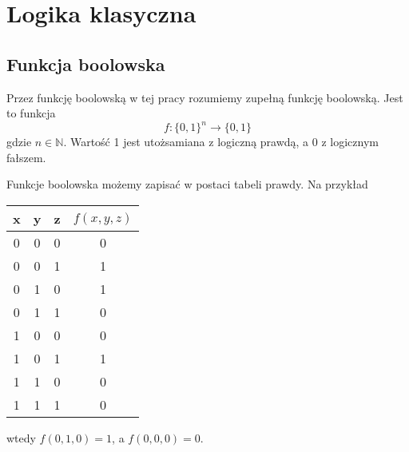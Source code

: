 \chapter{Logika klasyczna}
\thispagestyle{chapterBeginStyle}
\label{rozdzial0a}
\section{Funkcja boolowska}
\begin{definition}
    Przez funkcję boolowską w tej pracy rozumiemy zupełną funkcję boolowską. Jest to funkcja
    \[f:\{0,1\}^n \rightarrow \{0,1\}\]
    gdzie $n \in \mathbb{N}$. Wartość 1 jest utożsamiana z logiczną prawdą, a 0 z logicznym fałszem.
\end{definition}
\par Funkcje boolowska możemy zapisać w postaci tabeli prawdy. Na przykład
\begin{center}
    \begin{tabular}{| c  c  c | c |}
        \hline
        x & y & z & $f(x,y,z)$ \\ 
        \hline
        0 & 0 & 0 & 0 \\ 
        0 & 0 & 1 & 1 \\ 
        0 & 1 & 0 & 1 \\ 
        0 & 1 & 1 & 0 \\ 
        1 & 0 & 0 & 0 \\ 
        1 & 0 & 1 & 1 \\ 
        1 & 1 & 0 & 0 \\ 
        1 & 1 & 1 & 0 \\ 
        \hline 
    \end{tabular}
\end{center}
wtedy $f(0, 1, 0) = 1$, a $f(0,0,0) = 0$.
